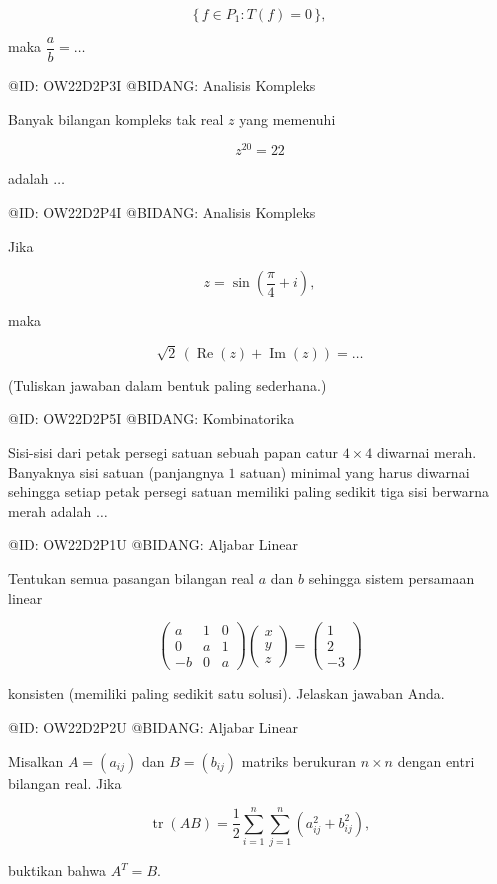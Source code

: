 $$
\{\,f\in P_1:T(f)=0\,\},
$$

maka $\dfrac{a}{b}=\ldots$

@ID: OW22D2P3I
@BIDANG: Analisis Kompleks

Banyak bilangan kompleks tak real $z$ yang memenuhi

$$
z^{20}=22
$$

adalah $\ldots$

@ID: OW22D2P4I
@BIDANG: Analisis Kompleks

Jika

$$
z=\sin\left(\frac{\pi}{4}+i\right),
$$

maka

$$
\sqrt2\,(\operatorname{Re}(z)+\operatorname{Im}(z))
=\ldots
$$

(Tuliskan jawaban dalam bentuk paling sederhana.)

@ID: OW22D2P5I
@BIDANG: Kombinatorika

Sisi-sisi dari petak persegi satuan sebuah papan catur $4\times4$ diwarnai merah. Banyaknya sisi satuan (panjangnya $1$ satuan) minimal yang harus diwarnai sehingga setiap petak persegi satuan memiliki paling sedikit tiga sisi berwarna merah adalah $\ldots$

@ID: OW22D2P1U
@BIDANG: Aljabar Linear

Tentukan semua pasangan bilangan real $a$ dan $b$ sehingga sistem persamaan linear

$$
\begin{pmatrix}
a&1&0\\
0&a&1\\
-b&0&a
\end{pmatrix}
\begin{pmatrix}
x\\
y\\
z
\end{pmatrix}
=
\begin{pmatrix}
1\\
2\\
-3
\end{pmatrix}
$$

konsisten (memiliki paling sedikit satu solusi). Jelaskan jawaban Anda.

@ID: OW22D2P2U
@BIDANG: Aljabar Linear

Misalkan $A=(a_{ij})$ dan $B=(b_{ij})$ matriks berukuran $n\times n$ dengan entri bilangan real. Jika

$$
\operatorname{tr}(AB)
=
\frac12
\sum_{i=1}^n
\sum_{j=1}^n
(a_{ij}^2+b_{ij}^2),
$$

buktikan bahwa $A^T=B$.

